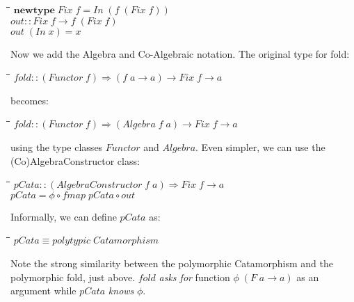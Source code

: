 \documentclass[10pt]{article}
\newlength{\lwidth}\setlength{\lwidth}{4.5cm}
\newlength{\cwidth}\setlength{\cwidth}{8mm} %
\newcommand{\Conid}[1]{\mathit{#1}}
\newcommand{\Varid}[1]{\mathit{#1}}
\begin{document}
\begin{tabbing}
\qquad\=\hspace{\lwidth}\=\hspace{\cwidth}\=\+\kill
${\mathbf{newtype}\;\Conid{Fix}\;\Varid{f}\mathrel{=}\Conid{In}\;(\Varid{f}\;(\Conid{Fix}\;\Varid{f}))}$\\
${}$\\
${\Varid{out}\mathbin{::}\Conid{Fix}\;\Varid{f}\to \Varid{f}\;(\Conid{Fix}\;\Varid{f})}$\\
${\Varid{out}\;(\Conid{In}\;\Varid{x})\mathrel{=}\Varid{x}}$
\end{tabbing}
Now we add the Algebra and Co-Algebraic notation. The original type
for fold:

\begin{tabbing}
\qquad\=\hspace{\lwidth}\=\hspace{\cwidth}\=\+\kill
${\Varid{fold}\mathbin{::}(\Conid{Functor}\;\Varid{f})\Rightarrow (\Varid{f}\;\Varid{a}\to \Varid{a})\to \Conid{Fix}\;\Varid{f}\to \Varid{a}}$
\end{tabbing}
becomes:

\begin{tabbing}
\qquad\=\hspace{\lwidth}\=\hspace{\cwidth}\=\+\kill
${\Varid{fold}\mathbin{::}(\Conid{Functor}\;\Varid{f})\Rightarrow (\Conid{Algebra}\;\Varid{f}\;\Varid{a})\to \Conid{Fix}\;\Varid{f}\to \Varid{a}}$
\end{tabbing}
using the type classes \ensuremath{\Conid{Functor}} and \ensuremath{\Conid{Algebra}}.  Even simpler, we can
use the (Co)AlgebraConstructor class:

\begin{tabbing}
\qquad\=\hspace{\lwidth}\=\hspace{\cwidth}\=\+\kill
${\Varid{pCata}\mathbin{::}(\Conid{AlgebraConstructor}\;\Varid{f}\;\Varid{a})\Rightarrow \Conid{Fix}\;\Varid{f}\to \Varid{a}}$\\
${\Varid{pCata}\mathrel{=}\Varid{\phi}\mathbin{\circ}\Varid{fmap}\;\Varid{pCata}\mathbin{\circ}\Varid{out}}$
\end{tabbing}
Informally, we can define \ensuremath{\Varid{pCata}} as:

\begin{tabbing}
\qquad\=\hspace{\lwidth}\=\hspace{\cwidth}\=\+\kill
${\Varid{pCata}\equiv \Varid{polytypic}\;\Conid{Catamorphism}}$
\end{tabbing}
Note the strong similarity between the polymorphic Catamorphism and
the polymorphic fold, just above.  \ensuremath{\Varid{fold}} \emph{asks for} function
\ensuremath{\Varid{\phi}\;(\Conid{F}\;\Varid{a}\to \Varid{a})} as an argument while \ensuremath{\Varid{pCata}} \emph{knows} \ensuremath{\Varid{\phi}}.
\end{document}
